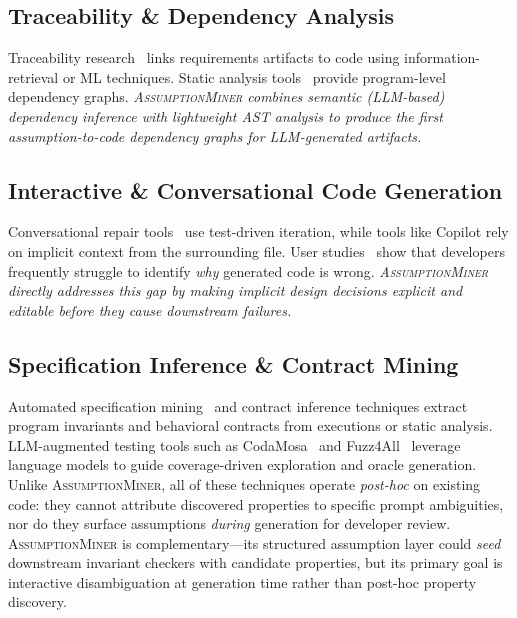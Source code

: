 \documentclass[sigconf,review,anonymous]{acmart}
\newcommand{\sysname}{\textsc{AssumptionMiner}\xspace}
\begin{document}
\subsection{Traceability \& Dependency Analysis}
Traceability research~\cite{rao2021traceability,mcmillan2011portfolio} links
requirements artifacts to code using information-retrieval or ML techniques.
Static analysis tools~\cite{livshits2015defense,guo2020graphcodebert} provide
program-level dependency graphs.
\emph{\sysname combines semantic (LLM-based) dependency inference with lightweight
AST analysis to produce the first assumption-to-code dependency graphs for
LLM-generated artifacts.}

\subsection{Interactive \& Conversational Code Generation}
Conversational repair tools~\cite{xia2023chatrepair} use test-driven iteration,
while tools like Copilot rely on implicit context from the surrounding file.
User studies~\cite{vaithilingam2022expectation,ziegler2022productivity} show that
developers frequently struggle to identify \emph{why} generated code is wrong.
\emph{\sysname directly addresses this gap by making implicit design decisions
explicit and editable before they cause downstream failures.}

\subsection{Specification Inference \& Contract Mining}
\label{sec:related-specmining}
Automated specification mining~\cite{ernst2007daikon} and contract inference
techniques extract program invariants and behavioral contracts from executions
or static analysis.
LLM-augmented testing tools such as CodaMosa~\cite{lemieux2023codamosa} and
Fuzz4All~\cite{xia2024fuzz4all} leverage language models to guide coverage-driven
exploration and oracle generation.
Unlike \sysname, all of these techniques operate \emph{post-hoc} on existing
code: they cannot attribute discovered properties to specific prompt ambiguities,
nor do they surface assumptions \emph{during} generation for developer review.
\sysname is complementary---its structured assumption layer could \emph{seed}
downstream invariant checkers with candidate properties, but its primary goal
is interactive disambiguation at generation time rather than post-hoc property
discovery.
\end{document}

